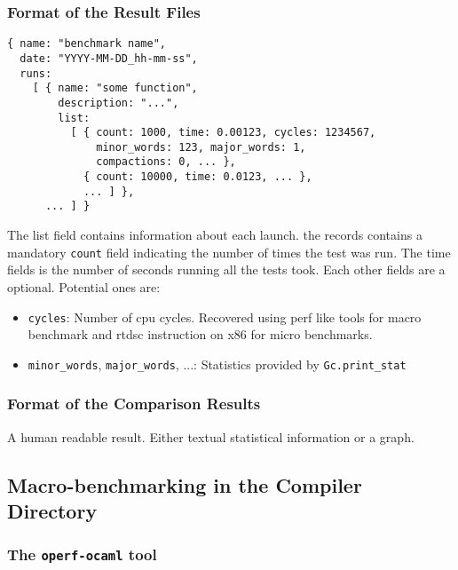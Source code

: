 \documentclass[11pt,a4paper]{article}
\begin{document}
\subsubsection{Format of the Result Files}\label{result-format}

\begin{verbatim}
{ name: "benchmark name",
  date: "YYYY-MM-DD_hh-mm-ss",
  runs:
    [ { name: "some function",
        description: "...",
        list:
          [ { count: 1000, time: 0.00123, cycles: 1234567,
              minor_words: 123, major_words: 1,
              compactions: 0, ... },
            { count: 10000, time: 0.0123, ... },
            ... ] },
      ... ] }
\end{verbatim}

The list field contains information about each launch. the records
contains a mandatory {\tt count} field indicating the number of times
the test was run. The time fields is the number of seconds running all
the tests took. Each other fields are a optional. Potential ones are:
\begin{itemize}
\item {\tt cycles}: Number of cpu cycles. Recovered using perf like
  tools for macro benchmark and rtdsc instruction on x86 for micro
  benchmarks.
\item {\tt minor\_words}, {\tt major\_words}, ...: Statistics provided
  by {\tt Gc.print\_stat}
\end{itemize}

\subsubsection{Format of the Comparison Results}

A human readable result. Either textual statistical information or a graph.
~\vspace{4cm}~
\subsection{Macro-benchmarking in the Compiler Directory}

\subsubsection{The {\tt operf-ocaml} tool}
\end{document}
